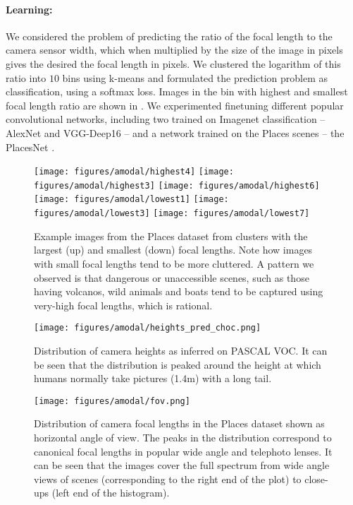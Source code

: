 \paragraph{Learning:} We considered the problem of predicting the ratio of the focal length to the camera sensor width, which when multiplied by the size of the image in pixels gives the desired the focal length in pixels. We clustered the logarithm of this ratio into $10$ bins using k-means and formulated the prediction problem as classification, using a softmax loss. Images in the bin with highest and smallest focal length ratio are shown in . We experimented finetuning different popular convolutional networks, including two trained on Imagenet classification -- AlexNet \cite{krizhevsky2012imagenet} and VGG-Deep16 \cite{simonyan2014very} -- and a network trained on the Places scenes -- the PlacesNet \cite{zhou2014learning}.

\begin{figure}[htb!]
  \centering
  \texttt{[image: figures/amodal/highest4]}
  \texttt{[image: figures/amodal/highest3]}  
  \texttt{[image: figures/amodal/highest6]}  
  \texttt{[image: figures/amodal/lowest1]}
  \texttt{[image: figures/amodal/lowest3]}  
  \texttt{[image: figures/amodal/lowest7]}
  \caption{ Example images from the Places dataset from clusters with the largest (up) and smallest (down) focal lengths. Note how images with small focal lengths tend to be more cluttered. A pattern we observed is that dangerous or unaccessible scenes, such as those having volcanos, wild animals and boats tend to be captured using very-high focal lengths,  which is rational.}
\end{figure}

\begin{figure}[htb!]
  \centering
  \begin{minipage}{.45\textwidth}
    \centering
    \texttt{[image: figures/amodal/heights\_pred\_choc.png]}
    \caption{ Distribution of camera heights as inferred on PASCAL VOC. It can be seen that the distribution is peaked around the height at which humans normally take pictures (1.4m) with a long tail.}
  \end{minipage}
  \hfill
  \begin{minipage}{.45\textwidth}
    \centering
    \texttt{[image: figures/amodal/fov.png]}
    \caption{ Distribution of camera focal lengths in the Places dataset shown as horizontal angle of view. The peaks in the distribution correspond to canonical focal lengths in popular wide angle and telephoto lenses. It can be seen that the images cover the full spectrum from wide angle views of scenes (corresponding to the right end of the plot) to close-ups (left end of the histogram).}
  \end{minipage}
  \end{figure}

